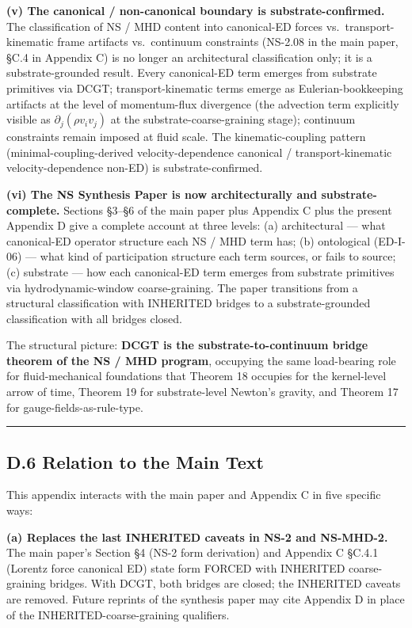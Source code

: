 \documentclass[
]{article}
\begin{document}
\textbf{(v) The canonical / non-canonical boundary is
substrate-confirmed.} The classification of NS / MHD content into
canonical-ED forces vs.~transport-kinematic frame artifacts
vs.~continuum constraints (NS-2.08 in the main paper, §C.4 in Appendix
C) is no longer an architectural classification only; it is a
substrate-grounded result. Every canonical-ED term emerges from
substrate primitives via DCGT; transport-kinematic terms emerge as
Eulerian-bookkeeping artifacts at the level of momentum-flux divergence
(the advection term explicitly visible as \(\partial_j(\rho v_iv_j)\) at
the substrate-coarse-graining stage); continuum constraints remain
imposed at fluid scale. The kinematic-coupling pattern
(minimal-coupling-derived velocity-dependence canonical /
transport-kinematic velocity-dependence non-ED) is substrate-confirmed.

\textbf{(vi) The NS Synthesis Paper is now architecturally and
substrate-complete.} Sections §3--§6 of the main paper plus Appendix C
plus the present Appendix D give a complete account at three levels: (a)
architectural --- what canonical-ED operator structure each NS / MHD
term has; (b) ontological (ED-I-06) --- what kind of participation
structure each term sources, or fails to source; (c) substrate --- how
each canonical-ED term emerges from substrate primitives via
hydrodynamic-window coarse-graining. The paper transitions from a
structural classification with INHERITED bridges to a substrate-grounded
classification with all bridges closed.

The structural picture: \textbf{DCGT is the substrate-to-continuum
bridge theorem of the NS / MHD program}, occupying the same load-bearing
role for fluid-mechanical foundations that Theorem 18 occupies for the
kernel-level arrow of time, Theorem 19 for substrate-level Newton's
gravity, and Theorem 17 for gauge-fields-as-rule-type.

\begin{center}\rule{0.5\linewidth}{0.5pt}\end{center}

\subsection{D.6 Relation to the Main
Text}\label{d.6-relation-to-the-main-text}

This appendix interacts with the main paper and Appendix C in five
specific ways:

\textbf{(a) Replaces the last INHERITED caveats in NS-2 and NS-MHD-2.}
The main paper's Section §4 (NS-2 form derivation) and Appendix C §C.4.1
(Lorentz force canonical ED) state form FORCED with INHERITED
coarse-graining bridges. With DCGT, both bridges are closed; the
INHERITED caveats are removed. Future reprints of the synthesis paper
may cite Appendix D in place of the INHERITED-coarse-graining
qualifiers.
\end{document}
